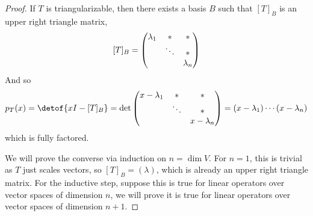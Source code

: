\begin{proof}

    If $T$ is triangularizable, then there exists a basis $B$ such that $[T]_B$ is an upper right triangle matrix,
    \[ [T]_B = \begin{pmatrix}\lambda_1 & * & * \\ & \ddots & * \\ & & \lambda_n\end{pmatrix} \]
    And so
    \[ p_T(x) = \detof{xI-[T]_B} = \det\pmat{x-\lambda_1 & * & * \\ & \ddots & * \\ & & x-\lambda_n} = (x-\lambda_1)\cdots(x-\lambda_n) \]
    which is fully factored.

    We will prove the converse via induction on $n=\dim V$.
    For $n=1$, this is trivial as $T$ just scales vectors, so $[T]_B=(\lambda)$, which is already an upper right triangle matrix.
    For the inductive step, suppose this is true for linear operators over vector spaces of dimension $n$, we will prove it is true for linear operators over vector spaces of dimension $n+1$.


\end{proof}
